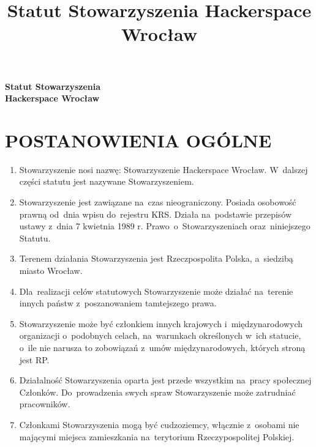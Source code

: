 \documentclass{article}
\title{Statut Stowarzyszenia Hackerspace Wrocław}
\begin{document}
\begin{center}
  \Huge\bf Statut Stowarzyszenia\\Hackerspace Wrocław
\end{center}
\vspace*{2cm}

\section{POSTANOWIENIA OGÓLNE}
  \begin{enumerate}
    \item Stowarzyszenie nosi nazwę: Stowarzyszenie Hackerspace Wrocław. W~dalszej części statutu jest nazywane Stowarzyszeniem.
    \item Stowarzyszenie jest zawiązane na~czas nieograniczony. Posiada osobowość prawną od~dnia wpisu do~rejestru KRS. Działa na~podstawie przepisów ustawy z~dnia 7 kwietnia 1989 r. Prawo~o~Stowarzyszeniach oraz~niniejszego Statutu.
    \item Terenem działania Stowarzyszenia jest Rzeczpospolita Polska, a~siedzibą miasto Wrocław.
    \item Dla~realizacji celów statutowych Stowarzyszenie może działać na~terenie innych państw z~poszanowaniem tamtejszego prawa.
    \item Stowarzyszenie może być członkiem innych krajowych i~międzynarodowych organizacji o~podobnych celach, na~warunkach określonych w~ich statucie, o~ile nie narusza to zobowiązań z~umów międzynarodowych, których stroną jest RP.
    \item Działalność Stowarzyszenia oparta jest przede wszystkim na~pracy społecznej Członków. Do~prowadzenia swych spraw Stowarzyszenie może zatrudniać pracowników.
    \item Członkami Stowarzyszenia mogą być cudzoziemcy, włącznie z~osobami nie mającymi miejsca zamieszkania na~terytorium Rzeczypospolitej Polskiej.
  \end{enumerate}
\end{document}
